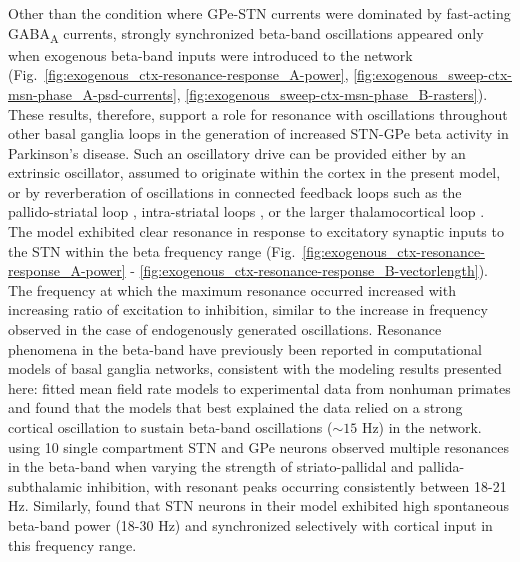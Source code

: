 %
Other than the condition where GPe-STN currents were dominated by fast-acting GABA\textsubscript{A} currents, strongly synchronized beta-band oscillations appeared only when exogenous beta-band inputs were introduced to the network (Fig.~\ref{fig:exogenous_ctx-resonance-response_A-power}, \ref{fig:exogenous_sweep-ctx-msn-phase_A-psd-currents}, \ref{fig:exogenous_sweep-ctx-msn-phase_B-rasters}). These results, therefore, support a role for resonance with oscillations throughout other basal ganglia loops in the generation of increased STN-GPe beta activity in Parkinson's disease. Such an oscillatory drive can be provided either by an extrinsic oscillator, assumed to originate within the cortex in the present model, or by reverberation of oscillations in connected feedback loops such as the pallido-striatal loop \cite{corbit_pallidostriatal_2016}, intra-striatal loops \cite{mccarthy_striatal_2011}, or the larger thalamocortical loop \cite{pavlides_computational_2015,kang_interaction_2013,reis_thalamocortical_2019,dovzhenok_origin_2012}.
%
The model exhibited clear resonance in response to excitatory synaptic inputs to the STN within the beta frequency range (Fig.~\ref{fig:exogenous_ctx-resonance-response_A-power} - \ref{fig:exogenous_ctx-resonance-response_B-vectorlength}). The frequency at which the maximum resonance occurred increased with increasing ratio of excitation to inhibition, similar to the increase in frequency observed in the case of endogenously generated oscillations. Resonance phenomena in the beta-band have previously been reported in computational models of basal ganglia networks, consistent with the modeling results presented here: \cite{pavlides_computational_2015} fitted mean field rate models to experimental data from nonhuman primates and found that the models that best explained the data relied on a strong cortical oscillation to sustain beta-band oscillations ($\sim 15$ Hz) in the network. \cite{ahn_synchronized_2016} using 10 single compartment STN and GPe neurons observed multiple resonances in the beta-band when varying the strength of striato-pallidal and pallida-subthalamic inhibition, with resonant peaks occurring consistently between 18-21 Hz. Similarly, \cite{fountas_role_2017} found that STN neurons in their model exhibited high spontaneous beta-band power (18-30 Hz) and synchronized selectively with cortical input in this frequency range.

%
%
%
%

%
%

%
%

%
%
%

